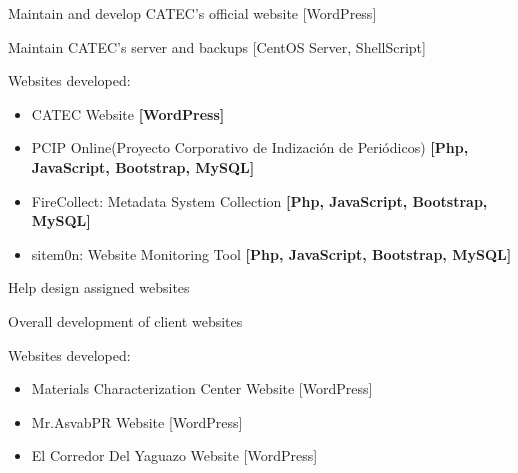 \documentclass[]{deedy-resume-openfont}
\begin{document}
\sectionsep

\break
{} %
\begin{tightemize}\item Maintain and develop CATEC's official                            website [WordPress] 
                  \item Maintain CATEC's server and backups [CentOS Server, ShellScript]
                  \item Websites developed:
                    \begin{itemize}
                        \item CATEC Website \textbf{[WordPress]}
                        \item PCIP Online(Proyecto Corporativo de Indización de Periódicos) \textbf{[Php, JavaScript, Bootstrap, MySQL]}
                        \item FireCollect: Metadata System  Collection \textbf{[Php, JavaScript, Bootstrap, MySQL]}
                        \item sitem0n: Website Monitoring Tool \textbf{[Php, JavaScript, Bootstrap, MySQL]}
                    \end{itemize}
\end{tightemize}
\sectionsep

\break
{}
\location{}
\begin{tightemize}
\item Help design assigned websites
\item Overall development of client websites 
\item Websites developed: \\ 
\begin{itemize}
    \item Materials Characterization Center Website [WordPress]
    \item Mr.AsvabPR Website [WordPress]
    \item El Corredor Del Yaguazo Website [WordPress]
\end{itemize}
\end{tightemize}
\sectionsep

\end{document}
